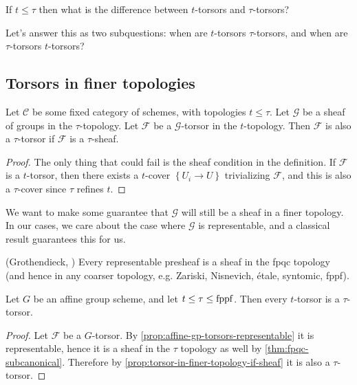 \documentclass[11pt,openany]{book}
\begin{document}
\begin{question} If $t \le \tau$ then what is the difference between $t$-torsors and $\tau$-torsors?
\end{question}

Let's answer this as two subquestions: when are $t$-torsors $\tau$-torsors, and when are $\tau$-torsors $t$-torsors?


\subsection{Torsors in finer topologies}

\begin{proposition}\label{prop:torsor-in-finer-topology-if-sheaf} 
Let $\mathscr{C}$ be some fixed category of schemes, with topologies $t\le\tau$. Let $\mathcal{G}$ be a sheaf of groups in the $\tau$-topology. Let $\mathcal{F}$ be a $\mathcal{G}$-torsor in the $t$-topology. Then $\mathcal{F}$ is also a $\tau$-torsor if $\mathcal{F}$ is a $\tau$-sheaf.
\end{proposition}
\begin{proof} The only thing that could fail is the sheaf condition in the definition. If $\mathcal{F}$ is a $t$-torsor, then there exists a $t$-cover $\left\{ U_i \to U \right\}$ trivializing $\mathcal{F}$, and this is also a $\tau$-cover since $\tau$ refines $t$. 
\end{proof}

We want to make some guarantee that $\mathcal{G}$ will still be a sheaf in a finer topology. In our cases, we care about the case where $\mathcal{G}$ is representable, and a classical result guarantees this for us.

\begin{theorem}\label{thm:fpqc-subcanonical} 
(Grothendieck, \cite[023Q]{Stacks}) Every representable presheaf is a sheaf in the fpqc topology (and hence in any coarser topology, e.g. Zariski, Nisnevich, \'etale, syntomic, fppf).
\end{theorem}

\begin{corollary} Let $G$ be an affine group scheme, and let $t \le \tau \le \mathrm{fppf}$. Then every $t$-torsor is a $\tau$-torsor.
\end{corollary}
\begin{proof} Let $\mathcal{F}$ be a $G$-torsor. By \autoref{prop:affine-gp-torsors-representable} it is representable, hence it is a sheaf in the $\tau$ topology as well by \autoref{thm:fpqc-subcanonical}. Therefore by \autoref{prop:torsor-in-finer-topology-if-sheaf} it is also a $\tau$-torsor.
\end{proof}
\end{document}
